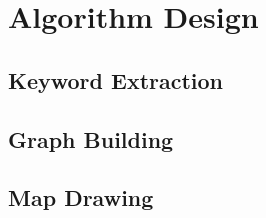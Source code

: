 \section{Algorithm Design}

\subsection{Keyword Extraction}

\subsection{Graph Building}

\subsection{Map Drawing}
